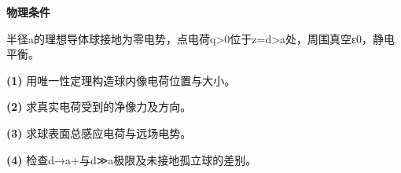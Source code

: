 \textbf{物理条件}\par 半径a的理想导体球接地为零电势，点电荷q>0位于z=d>a处，周围真空ε0，静电平衡。
\par\noindent\textbf{(1)} 用唯一性定理构造球内像电荷位置与大小。
\par\noindent\textbf{(2)} 求真实电荷受到的净像力及方向。
\par\noindent\textbf{(3)} 求球表面总感应电荷与远场电势。
\par\noindent\textbf{(4)} 检查d→a+与d≫a极限及未接地孤立球的差别。
